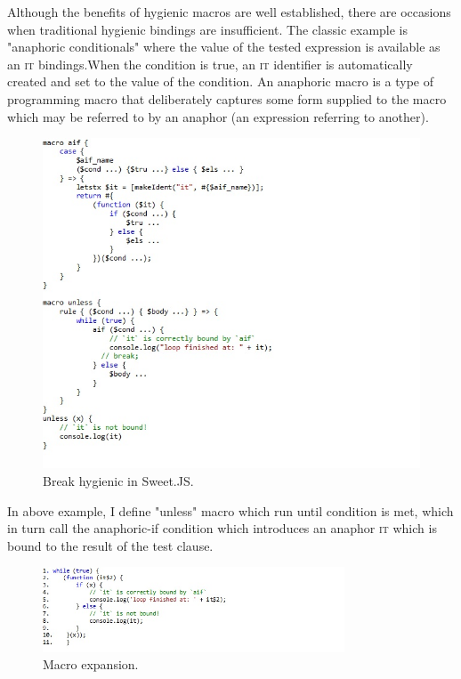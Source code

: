 Although the benefits of hygienic macros are well established, there are occasions when traditional hygienic bindings are insufficient. The classic example is "anaphoric conditionals" where the value of the tested expression is available as an \textsc{it} bindings.When the condition is true, an \textsc{it} identifier is automatically created and set to the value of the condition. An anaphoric macro is a type of programming macro that deliberately captures some form supplied to the macro which may be referred to by an anaphor (an expression referring to another).

\newpage
\begin{figure}
\centering
\includegraphics[width=1.0\textwidth]{images/Breakhygiene.jpg}
\caption{Break hygienic in Sweet.JS.} 
\label{fig:Breakhygiene}

\end{figure}
In above example, I define "unless" macro which run until condition is met, which in turn call the anaphoric-if condition which introduces an anaphor \textsc{it} which is bound to the result of the test clause.

\newpage
\begin{figure}

\centering
\includegraphics[width=0.8\textwidth]{images/macroexpansion.jpg}
\caption{Macro expansion.} 
\label{fig:macroexpansion}

\end{figure}

